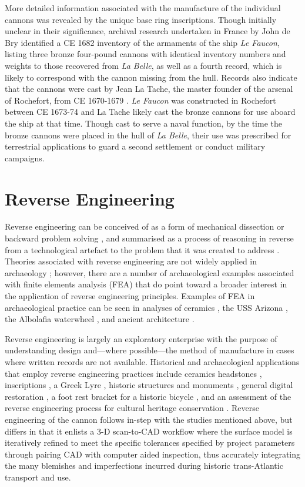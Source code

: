 \documentclass[review]{elsarticle}
\begin{document}
More detailed information associated with the manufacture of the individual cannons was revealed by the unique base ring inscriptions. Though initially unclear in their significance, archival research undertaken in France by John de Bry identified a CE 1682 inventory of the armaments of the ship \textit{Le Faucon}, listing three bronze four-pound cannons with identical inventory numbers and weights to those recovered from \textit{La Belle}, as well as a fourth record, which is likely to correspond with the cannon missing from the hull. Records also indicate that the cannons were cast by Jean La Tache, the master founder of the arsenal of Rochefort, from CE 1670-1679 \citep[356-357]{RN5763}. \textit{Le Faucon} was constructed in Rochefort between CE 1673-74 and La Tache likely cast the bronze cannons for use aboard the ship at that time. Though cast to serve a naval function, by the time  the bronze cannons were placed in the hull of\textit{ La Belle}, their use was prescribed for terrestrial applications to guard a second settlement or conduct military campaigns.

\section*{Reverse Engineering}

Reverse engineering can be conceived of as a form of mechanical dissection or backward problem solving \citep{RN5750}, and summarised as a process of reasoning in reverse from a technological artefact to the problem that it was created to address \citep{RN5751}. Theories associated with reverse engineering are not widely applied in archaeology \citep{RN5752}; however, there are a number of archaeological examples associated with finite elements analysis (FEA) that do point toward a broader interest in the application of reverse engineering principles. Examples of FEA in archaeological practice can be seen in analyses of ceramics \citep{RN327,RN5753}, the USS Arizona \citep{RN325}, the Albolafia waterwheel \citep{RN5754}, and ancient architecture \citep{RN5755}.

Reverse engineering is largely an exploratory enterprise with the purpose of understanding design and---where possible---the method of manufacture in cases where written records are not available. Historical and archaeological applications that employ reverse engineering practices include ceramics \citep{RN5769,RN5770} headstones \citep{RN456}, inscriptions \citep{RN5756}, a Greek Lyre \citep{RN5757}, historic structures and monuments \citep{RN5771,RN5772}, general digital restoration \citep{RN5760}, a foot rest bracket for a historic bicycle \citep{RN5758}, and an assessment of the reverse engineering process for cultural heritage conservation \citep{RN5759}. Reverse engineering of the cannon follows in-step with the studies mentioned above, but differs in that it enlists a 3-D scan-to-CAD workflow where the surface model is iteratively refined to meet the specific tolerances specified by project parameters through pairing CAD with computer aided inspection, thus accurately integrating the many blemishes and imperfections incurred during historic trans-Atlantic transport and use.
\end{document}
